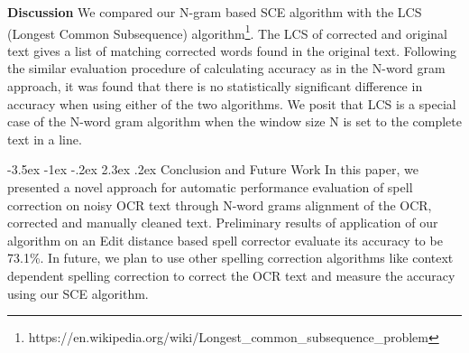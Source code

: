 \documentclass[12pt]{article}
\makeatletter
\renewcommand\section{\@startsection{section}{1}{\z@}%
                                  {-3.5ex \@plus -1ex \@minus -.2ex}%
                                  {2.3ex \@plus.2ex}%
                                  {\normalfont\bfseries}}
\makeatother
\begin{document}
\noindent \textbf{Discussion }
We compared our N-gram based SCE algorithm with the LCS (Longest Common Subsequence) algorithm\footnote{https://en.wikipedia.org/wiki/Longest\_common\_subsequence\_problem}. The LCS of corrected and original text gives a list of matching corrected words found in the original text. Following the similar evaluation procedure of calculating accuracy as in the N-word gram approach, %
it was found that there is no statistically significant difference in accuracy when using either of the two algorithms. We posit that LCS is a special case of the N-word gram algorithm when the window size N is set to the complete text in a line.


\section{Conclusion and Future Work}
\label{spell:fw}
In this paper, we presented a novel approach for automatic performance evaluation of spell correction on noisy OCR text through N-word grams alignment of the OCR, corrected and manually cleaned text. Preliminary results of application of our algorithm on an Edit distance based spell corrector evaluate its accuracy to be 73.1\%. %
In future, we plan to use other spelling correction algorithms like context dependent spelling correction to correct the OCR text and measure the accuracy using our SCE algorithm. 
\end{document}
